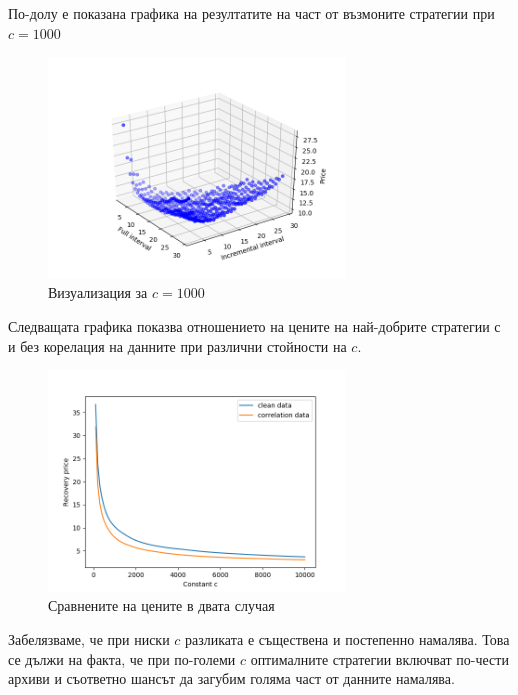 \documentclass[11pt, a4paper]{article}
\theoremstyle{definition}
\begin{document}
		По-долу е показана графика на резултатите на част от възмоните стратегии при $c = 1000$
		\begin{figure}[H]
			\begin{minipage}{1.0\textwidth}
				\centering
				\includegraphics[width=0.7\textwidth]{3d_all_1.png}
				\caption{Визуализация за $c=1000$}\label{Fig:Whole_model}
			\end{minipage}
		\end{figure}
		Следващата графика показва отношението на цените на най-добрите стратегии с и без корелация на данните при различни стойности на $c$.
		\begin{figure}[H]
			\begin{minipage}{1.0\textwidth}
				\centering
				\includegraphics[width=0.7\textwidth]{correlation_vs_clean.png}
				\caption{Сравнените на цените в двата случая}\label{Fig:Corr_vs_clean}
			\end{minipage}
		\end{figure}
		Забелязваме, че при ниски $c$ разликата е съществена и постепенно намалява. Това се дължи на факта, че при по-големи $c$ оптималните стратегии включват по-чести архиви и съответно шансът да загубим голяма част от данните намалява.
\newpage	
\end{document}
